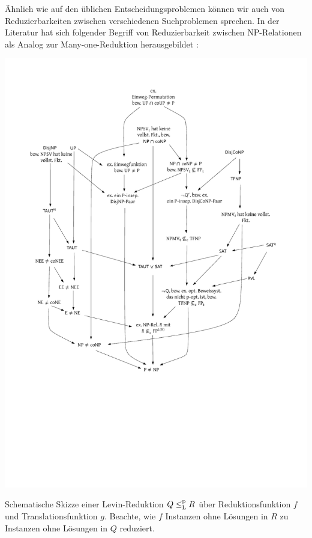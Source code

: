 Ähnlich wie auf den üblichen Entscheidungsproblemen können wir auch von Reduzierbarkeiten zwischen verschiedenen Suchproblemen sprechen. In der Literatur hat sich folgender Begriff von Reduzierbarkeit zwischen NP-Relationen als Analog zur Many-one-Reduktion herausgebildet \parencites(vgl.)()[229]{papadimitriou_computational_1994}[61]{goldreich_computational_2008}[50]{arora_computational_2009}:
\begin{marginfigure}[-4cm]
    \centering\includegraphics[page=11]{figures.pdf}\vspace*{2ex}
    \caption{Schematische Skizze einer Levin-Reduktion $Q\leq_\mathrm{L}^\mathrm{p} R$ über Reduktionsfunktion $f$ und Translationsfunktion $g$. Beachte, wie $f$ Instanzen ohne Lösungen in $R$ zu Instanzen ohne Lösungen in $Q$ reduziert.}
\end{marginfigure}

